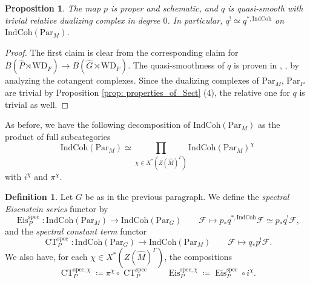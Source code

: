\documentclass{amsart}
\newtheorem{lemma}[theorem]{Lemma}
\newtheorem{proposition}[theorem]{Proposition}
\theoremstyle{definition}
\newtheorem{definition}[theorem]{Definition}
\theoremstyle{remark}
\numberwithin{equation}{section}
\newcommand{\mc}{\mathcal}
\newcommand{\spec}{\mathrm{spec}}
\newcommand{\wh}{\widehat}
\newcommand{\Par}{\mathrm{Par}}
\newcommand{\IndCoh}{\mathrm{IndCoh}}
\DeclareMathOperator{\Eis}{\mathrm{Eis}}
\DeclareMathOperator{\CT}{\mathrm{CT}}
\newcommand{\WD}{\mathrm{WD}}
\begin{document}
\begin{proposition}{\label{prop: pandqproperties}}
The map $p$ is proper and schematic, and $q$ is quasi-smooth with trivial relative dualizing complex in degree $0$. In particular, $q^! \simeq q^{\ast, \IndCoh}$ on $\IndCoh(\Par_M)$.      
\end{proposition}

\begin{proof}
The first claim is clear from the corresponding claim for $B(\wh{P}\rtimes \WD_F)\to B(\wh{G}\rtimes \WD_F)$. The quasi-smoothness of $q$ is proven in \cite[Lemma 3.21]{Zhu}, \cite[Lemma 3.5.3]{HansenMann}, by analyzing the cotangent complexes. Since the dualizing complexes of $\Par_M$, $\Par_P$ are trivial by Proposition \ref{prop: properties_of_Sect} (4), the relative one for $q$ is trivial as well. 
\end{proof}

As before, we have the following decomposition of $\IndCoh(\Par_M)$ as the product of full subcategories
\begin{equation*}
    \IndCoh(\Par_M) \simeq \prod\limits_{\chi \in X^*(Z(\wh{M})^{\Gamma})} \IndCoh(\Par_M)^{\chi}
\end{equation*}
with $i^\chi$ and $\pi^\chi$. 

\begin{definition}{\label{def: CTEis}}
Let $G$ be as in the previous paragraph. We define the \emph{spectral Eisenstein series} functor by
\begin{equation*}
    \Eis^{\spec}_P\colon \IndCoh(\Par_M) \rightarrow \IndCoh(\Par_G) \qquad \mc{F} \mapsto p_{\ast}q^{\ast, \IndCoh} \mc{F}\simeq p_* q^! \mc{F},
\end{equation*}
and the \emph{spectral constant term} functor
\begin{equation*}
    \CT^{\spec}_P\colon \IndCoh(\Par_G)\rightarrow \IndCoh(\Par_M) \qquad \mc{F} \mapsto q_{\ast}p^!\mc{F}.
\end{equation*}
We also have, for each $\chi \in X^*(Z(\wh{M})^{\Gamma})$, the compositions 
\begin{equation*}
    \CT^{\spec, \chi}_P \coloneq \pi^{\chi} \circ \CT^{\spec}_P \qquad \Eis^{\spec, \chi}_P \coloneq \Eis^{\spec}_P \circ i^{\chi}.
\end{equation*}
\end{definition}
\end{document}
